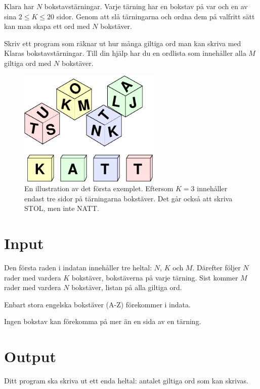 
Klara har $N$ bokstavstärningar.
Varje tärning har en bokstav på var och en av sina $2 \le K \le 20$ sidor.
Genom att slå tärningarna och ordna dem på valfritt sätt kan man skapa ett ord med $N$ bokstäver.

Skriv ett program som räknar ut hur många giltiga ord man kan skriva med Klaras bokstavstärningar.
Till din hjälp har du en ordlista som innehåller alla $M$ giltiga ord med $N$ bokstäver.

\begin{figure}[ht!]
\centering
\includegraphics[width=0.6\textwidth]{tarningar.png}
\caption{En illustration av det första exemplet. Eftersom $K=3$ innehåller endast tre sidor på tärningarna bokstäver. Det går också att skriva STOL, men inte NATT.}
\label{overflow}
\end{figure}

\section*{Input}

Den första raden i indatan innehåller tre heltal: $N$, $K$ och $M$.
Därefter följer $N$ rader med vardera $K$ bokstäver, bokstäverna på varje tärning.
Sist kommer $M$ rader med vardera $N$ bokstäver, listan på alla giltiga ord.

Enbart stora engelska bokstäver (A-Z) förekommer i indata.

Ingen bokstav kan förekomma på mer än en sida av en tärning.

\section*{Output}

Ditt program ska skriva ut ett enda heltal: antalet giltiga ord som kan skrivas.


